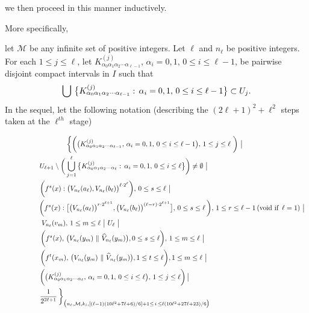 \documentclass[12pt]{article}
\newcommand{\al}{\alpha}
\begin{document}
we then proceed in this manner inductively.  

More specifically, 

let $\mathcal M$ be any infinite set of positive integers.  Let $\ell$ and $n_\ell$ be positive integers.  For each $1 \le j \le \ell$, let $K_{\al_0\al_1\al_2\cdots \al_{\ell-1}}^{(j)}$, $\al_i = 0, 1, \, 0 \le i \le \ell-1$, be pairwise disjoint compact intervals in $I$ such that 
$$
\bigcup \, \big\{ K_{\al_0\al_1\al_2\cdots \al_{\ell-1}}^{(j)}: \, \al_i = 0, 1, \, 0 \le i \le \ell-1 \big\} \subset U_j.\vspace{.1in}
$$
\indent In the sequel, let the following notation (describing the $(2\ell+1)^2+\ell^2$ steps taken at the $\ell^{th}$ stage)

\begin{multline*}
$$
\bigg\{ \bigg( \big(K_{\al_0\al_1\al_2\cdots \al_{\ell-1}}^{(j)}, \, \al_i = 0, 1, \, 0 \le i \le \ell-1 \big), \, 1 \le j \le \ell \,\, \bigg) \,\, \big| \,\,\, \\ 
\qquad\qquad\quad U_{\ell+1} \setminus \bigg( \bigcup_{j=1}^\ell \big\{ K_{\al_0\al_1\al_2\cdots\al_{\ell}}^{(j)}: \, \al_i = 0, 1, \, 0 \le i \le \ell \big\} \bigg) \ne \emptyset \,\, \big| \quad\qquad\qquad\qquad\qquad\qquad\quad\quad\quad\,\,\, \\  
\,\, \bigg(f^s(x) : \big(V_{n_\ell}(a_\ell), V_{n_\ell}(b_\ell)\big)^{\ell \cdot 2^\ell}\bigg), \, 0 \le s \le \ell \,\, \big| \qquad\qquad\qquad\qquad\qquad\qquad\qquad\quad\, \\
\qquad\qquad\,\,\, \bigg(f^s(x) : \big[\big(V_{n_\ell}(a_\ell)\big)^{r \cdot 2^{\ell+1}}, \big(V_{n_\ell}(b_\ell)\big)^{(\ell-r) \cdot 2^{\ell+1}} \big], \, 0 \le s \le \ell \, \bigg), \, 1 \le r \le \ell-1 \, (\text{void if} \,\,\, \ell = 1) \,\, \big| \\
V_{n_\ell}(v_m), \, 1 \le m \le \ell \,\, \big| \,\, U_\ell \,\, \big|\qquad\qquad\qquad\qquad\qquad\qquad\qquad\qquad\qquad\qquad\qquad \\   
\,\, \bigg(f^{s}(x), \, \big(V_{n_\ell}(y_m) \,\, \| \,\, \widehat V_{n_\ell}(y_m)\big), 0 \le s \le \ell\bigg), \, 1 \le m \le \ell \,\, \big| \qquad\qquad\qquad\qquad\quad\quad\, \\ 
\qquad \bigg(f^t(x_m), \, \big(V_{n_\ell}(y_m) \,\, \| \,\, \widehat V_{n_\ell}(y_m)\big), 1 \le t \le \ell\bigg), 1 \le m \le \ell \,\, \big| \qquad\qquad\qquad\qquad\qquad\quad\,\,\, \\ 
\bigg(\big(K_{\al_0\al_1\al_2\cdots \al_{\ell}}^{(j)}, \, \al_i = 0, 1, \, 0 \le i \le \ell\big), \, 1 \le j \le \ell\bigg) \, \big| \qquad\qquad\qquad\qquad\qquad\qquad\, \\ 
\qquad \frac 1{2^{2\ell+1}} \, \bigg\}_{\big(n_\ell,\mathcal M,k_i, [(\ell-1)(10\ell^2+7\ell+6)/6]+1 \le \, i \, \le \ell(10\ell^2+27\ell+23)/6\big)}\,\,\qquad\qquad\qquad\qquad\qquad\,\,\,\,\,
$$
\end{multline*}
\end{document}
